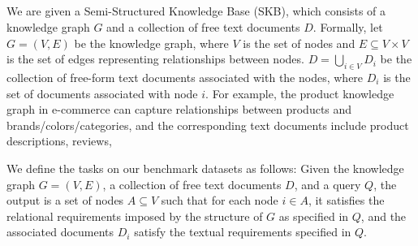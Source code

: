 \subsection{}
\label{sec:def}
\vspace{-3pt}
We are given a Semi-Structured Knowledge Base (SKB), which consists of a knowledge graph \( G \) and a collection of free text documents  $D$. 
Formally, let \( G = (V, E) \) be the knowledge graph, where \( V \) is the set of nodes and \( E \subseteq V \times V \) is the set of edges representing relationships between nodes. \( D = \bigcup_{i \in V} D_i \) be the collection of free-form text documents associated with the nodes, where \( D_i \) is the set of documents associated with node \( i \). For example, the product knowledge graph in e-commerce can capture relationships between products and brands/colors/categories, and the corresponding text documents include product descriptions, reviews, \etc

We define the tasks on our benchmark datasets as follows: 
Given the knowledge graph \( G = (V, E) \), a collection of free text documents \( D \), and a query \( Q \), the output is a set of nodes \( A \subseteq V \) such that for each node \( i \in A \), it satisfies the relational requirements imposed by the structure of \( G \) as specified in \( Q \), and the associated documents \( D_i \) satisfy the textual requirements specified in \( Q \). 


